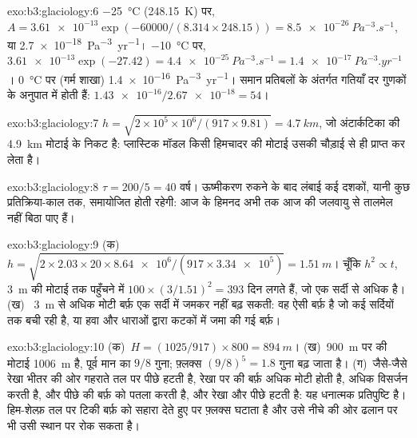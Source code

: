 \begin{solution}{exo:b3:glaciology:6}
\qty{-25}{\celsius} (\qty{248.15}{K}) पर, $A = \num{3.61e-13}\exp(-60000/
(8.314\times248.15)) = \qty{8.5e-26}{Pa^{-3}.s^{-1}}$, या
\qty{2.7e-18}{Pa^{-3}.yr^{-1}}। \qty{-10}{\celsius} पर, $\num{3.61e-13}
\exp(-27.42) = \qty{4.4e-25}{Pa^{-3}.s^{-1}} = \qty{1.4e-17}{Pa^{-3}.yr^{-1}}$।
\qty{0}{\celsius} पर (गर्म शाखा) \qty{1.4e-16}{Pa^{-3}.yr^{-1}}। समान प्रतिबलों के अंतर्गत
गतियाँ दर गुणकों के अनुपात में होती हैं:
$\num{1.43e-16}/\num{2.67e-18} = 54$।
\end{solution}

\begin{solution}{exo:b3:glaciology:7}
$h = \sqrt{2\times10^5\times10^6/(917\times9.81)} = \qty{4.7}{km}$, जो अंटार्कटिका की
\qty{4.9}{km} मोटाई के निकट है: प्लास्टिक मॉडल किसी हिमचादर की मोटाई
उसकी चौड़ाई से ही प्राप्त कर लेता है।
\end{solution}

\begin{solution}{exo:b3:glaciology:8}
$\tau = 200/5 = \num{40}\text{ वर्ष}$। ऊष्मीकरण रुकने के बाद लंबाई
कई दशकों, यानी कुछ प्रतिक्रिया-काल तक, समायोजित होती रहेगी: आज के हिमनद
अभी तक आज की जलवायु से तालमेल नहीं बिठा पाए हैं।
\end{solution}

\begin{solution}{exo:b3:glaciology:9}
(क)~$h = \sqrt{2\times2.03\times20\times\num{8.64e6}/(917\times\num{3.34e5})}
= \qty{1.51}{m}$। चूँकि $h^2 \propto t$, \qty{3}{m} की मोटाई तक पहुँचने में $100\times
(3/1.51)^2 = 393$ दिन लगते हैं, जो एक सर्दी से अधिक है। (ख)~
\qty{3}{m} से अधिक मोटी बर्फ़ एक सर्दी में जमकर नहीं बढ़ सकती: वह ऐसी बर्फ़ है जो
कई सर्दियों तक बची रही है, या हवा और धाराओं द्वारा कटकों में जमा की गई बर्फ़।
\end{solution}

\begin{solution}{exo:b3:glaciology:10}
(क)~$H = (1025/917)\times800 = \qty{894}{m}$। (ख)~\qty{900}{m} पर
 की मोटाई \qty{1006}{m} है, पूर्व मान का $9/8$ गुना; फ़्लक्स
$(9/8)^5 = 1.8$ गुना बढ़ जाता है। (ग)~जैसे-जैसे रेखा भीतर की ओर गहराते तल पर पीछे हटती है,
रेखा पर की बर्फ़ अधिक मोटी होती है, अधिक विसर्जन करती है, और पीछे की
बर्फ़ को पतला करती है, और रेखा और पीछे हटती है: यह धनात्मक प्रतिपुष्टि है। हिम-शेल्फ़
तल पर टिकी बर्फ़ को सहारा देते हुए  पर फ़्लक्स घटाता है और
उसे नीचे की ओर ढलान पर भी उसी स्थान पर रोक सकता है।
\end{solution}

